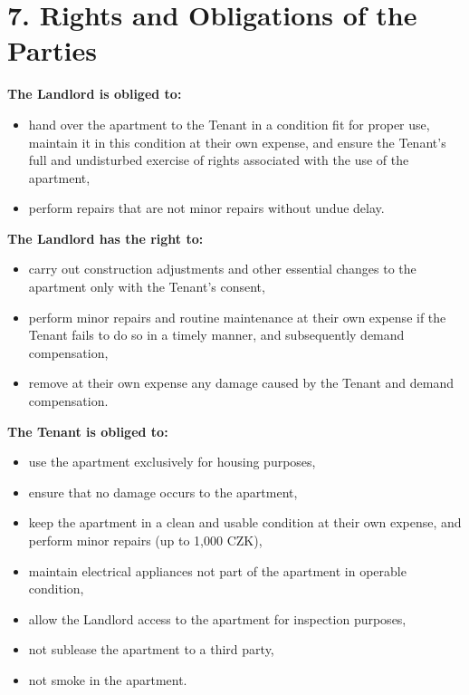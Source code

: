 \section*{7. Rights and Obligations of the Parties}

\textbf{The Landlord is obliged to:}
\begin{itemize}
    \item hand over the apartment to the Tenant in a condition fit for proper use, maintain it in this condition at their own expense, and ensure the Tenant’s full and undisturbed exercise of rights associated with the use of the apartment,
    \item perform repairs that are not minor repairs without undue delay.
\end{itemize}

\textbf{The Landlord has the right to:}
\begin{itemize}
    \item carry out construction adjustments and other essential changes to the apartment only with the Tenant's consent,
    \item perform minor repairs and routine maintenance at their own expense if the Tenant fails to do so in a timely manner, and subsequently demand compensation,
    \item remove at their own expense any damage caused by the Tenant and demand compensation.
\end{itemize}

\textbf{The Tenant is obliged to:}
\begin{itemize}
    \item use the apartment exclusively for housing purposes,
    \item ensure that no damage occurs to the apartment,
    \item keep the apartment in a clean and usable condition at their own expense, and perform minor repairs (up to 1,000 CZK),
    \item maintain electrical appliances not part of the apartment in operable condition,
    \item allow the Landlord access to the apartment for inspection purposes,
    \item not sublease the apartment to a third party,
    \item not smoke in the apartment.
\end{itemize}
